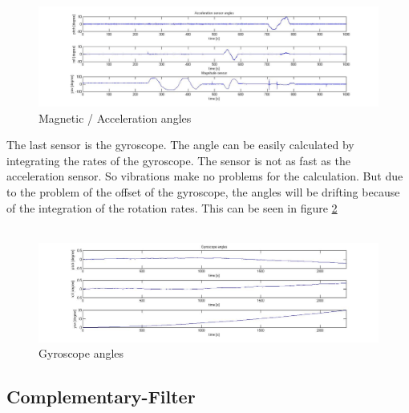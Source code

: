 \begin{figure}[H]
	\centering\includegraphics[width=1.0\textwidth]{fig/Kal_Comp/Magn_Acc.jpg}
	\caption{Magnetic / Acceleration angles}
	\label{fig:Mag_Acc}
\end{figure}

The last sensor is the gyroscope. The angle can be easily calculated by integrating the rates of the gyroscope. The sensor is not as fast as the acceleration sensor. So vibrations make no problems for the calculation. But due to the problem of the offset of the gyroscope, the angles will be drifting because of the integration of the rotation rates. This can be seen in figure \ref{fig:Comp_gyro}\\\\

\begin{figure}[H]
	\centering\includegraphics[width=1.0\textwidth]{fig/Kal_Comp/Comp_gyro.jpg}
	\caption{Gyroscope angles}
	\label{fig:Comp_gyro}
\end{figure}


\newpage
\subsection{Complementary-Filter}
\label{subsec:ComplementaryFilter}


